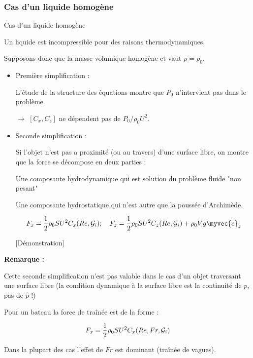 \subsubsection{Cas d'un liquide homogène}
\begin{frame}{Cas d'un liquide homogène}

\small

Un liquide est incompressible pour des raisons thermodynamiques.

Supposons donc que la masse volumique homogène et vaut $\rho = \rho_0$.


\medskip
\pause 

\begin{itemize} 
\item Première simplification :

L'étude de la structure des équations montre que $P_0$ n'intervient pas dans le problème.

$\rightarrow$  $[C_x,C_z]$ ne dépendent pas de $P_0/\rho_0 U^2$.


\smallskip
\pause 

\item Seconde simplification : 

Si l'objet n'est pas a proximité (ou au travers) d'une surface libre, on montre  que la force se décompose en deux parties : 

Une composante hydrodynamique qui est solution du problème fluide "non pesant"   

Une composante hydrostatique qui n'est autre que la poussée d'Archimède.
 
 \smallskip
$$
{F_x} = \frac{1}{2} \rho_0 S U^2 C_x(Re, {\cal G}_i) ; \quad {F_z} = \frac{1}{2} \rho_0 S U^2 C_z(Re, {\cal G}_i) + \rho_0 V g \myvec{e}_z
$$

{\color{vert}[Démonstration]}

\end{itemize}

\pause
\medskip
{\bf Remarque : }

Cette seconde simplification n'est pas valable dans le cas d'un objet traversant une surface libre 
(la condition dynamique à la surface libre est la continuité de $p$, pas de $\hat{p}$ !)
\smallskip
\pause 

Pour un bateau la force de traînée est de la forme :

$$
{F_x} = \frac{1}{2} \rho_0 S U^2 C_x(Re,Fr, {\cal G}_i) 
$$

Dans la plupart des cas l'effet de $Fr$ est dominant  (traînée de vagues).


\end{frame}

